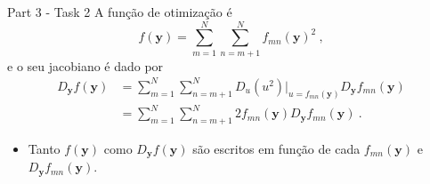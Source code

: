 \documentclass{beamer}					%
\begin{document}
\begin{frame}{Part 3  - Task 2}
	A função de otimização é
	\begin{equation*}\label{eq:deff}
	f(\mathbf{y}) = \sum_{m=1}^{N}\sum_{n=m+1}^{N} f_{mn}(\mathbf{y})^2 \:,
	\end{equation*} 
	e o seu jacobiano é dado por
	\begin{equation*}
	\begin{split}
	D_{\mathbf{y}}f(\mathbf{y}) &= \sum_{m=1}^{N}\sum_{n=m+1}^{N} D_u(u^2)\biggr\rvert_{u=f_{mn}(\mathbf{y})}D_{\mathbf{y}}f_{mn}(\mathbf{y})\\
	&= \sum_{m=1}^{N}\sum_{n=m+1}^{N} 2f_{mn}(\mathbf{y})D_{\mathbf{y}}f_{mn}(\mathbf{y})\:.
	\end{split}
	\end{equation*}
	\begin{itemize}
	\item Tanto $f(\mathbf{y})$ como $D_{\mathbf{y}}f(\mathbf{y})$ são escritos em função de cada $f_{mn}(\mathbf{y})$ e $D_{\mathbf{y}}f_{mn}(\mathbf{y})$.
\end{itemize}
\end{frame}
\end{document}
